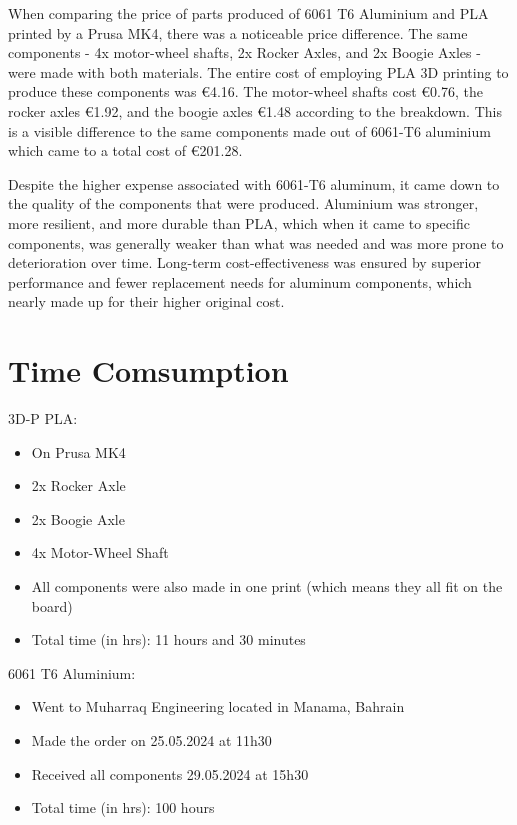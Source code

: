     When comparing the price of parts produced of 6061 T6 Aluminium and PLA printed by a Prusa MK4, there
    was a noticeable price difference. The same components - 4x motor-wheel shafts, 2x Rocker Axles, and 2x Boogie Axles - were made with both materials. The entire cost of employing PLA 3D printing to produce
    these components was €4.16. The motor-wheel shafts cost €0.76, the rocker axles €1.92, and the boogie
    axles €1.48 according to the breakdown. This is a visible difference to the same components made out of
    6061-T6 aluminium which came to a total cost of €201.28.

    Despite the higher expense associated with 6061-T6 aluminum, it came down to the quality of the components that were produced. Aluminium was stronger, more resilient, and more durable than PLA,
    which when it came to specific components, was generally weaker than what was needed and was more
    prone to deterioration over time. Long-term cost-effectiveness was ensured by superior performance
    and fewer replacement needs for aluminum components, which nearly made up for their higher original
    cost.

\section{Time Comsumption}

    3D-P PLA:
    \begin{itemize}
        \item On Prusa MK4
        \item 2x Rocker Axle
        \item 2x Boogie Axle
        \item 4x Motor-Wheel Shaft
        \item All components were also made in one print (which means they all fit on the board)
        \item Total time (in hrs): 11 hours and 30 minutes
    \end{itemize}

    \newpage

    6061 T6 Aluminium:
    \begin{itemize}
        \item Went to Muharraq Engineering located in Manama, Bahrain
        \item Made the order on 25.05.2024 at 11h30
        \item Received all components 29.05.2024 at 15h30
        \item Total time (in hrs): 100 hours
    \end{itemize}

